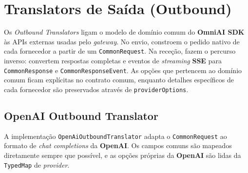     \section{Translators de Saída (Outbound)}

    Os \textit{Outbound Translators} ligam o modelo de domínio comum do \textbf{OmniAI SDK} às APIs externas usadas pelo \textit{gateway}. No envio, constroem o pedido nativo de cada fornecedor a partir de um \texttt{CommonRequest}. Na receção, fazem o percurso inverso: convertem respostas completas e eventos de \textit{streaming} \textbf{SSE} para \texttt{CommonResponse} e \texttt{CommonResponseEvent}. As opções que pertencem ao domínio comum ficam explícitas no contrato comum, enquanto detalhes específicos de cada fornecedor são preservados através de \texttt{providerOptions}.

    \subsection{\textbf{OpenAI} Outbound Translator}

    A implementação \texttt{OpenAiOutboundTranslator} adapta o \texttt{CommonRequest} ao formato de \textit{chat completions} da \textbf{OpenAI}. Os campos comuns são mapeados diretamente sempre que possível, e as opções próprias da \textbf{OpenAI} são lidas da \texttt{TypedMap} de \textit{provider}.


